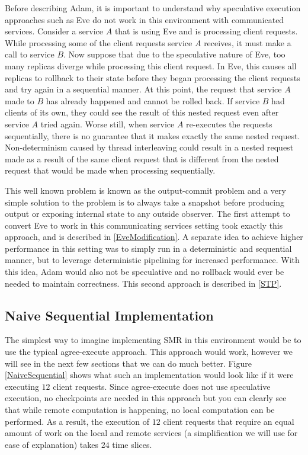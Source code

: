 \documentclass[11pt, oneside]{report}
\begin{document}
Before describing Adam, it is important to understand why speculative execution approaches such as Eve do not work in this environment with communicated services. 
Consider a service $A$ that is using Eve and is processing client requests. 
While processing some of the client requests service $A$ receives, it must make a call to service $B$. 
Now suppose that due to the speculative nature of Eve, too many replicas diverge while processing this client request. In Eve, this causes all replicas to rollback to their state before they began processing the client requests and try again in a sequential manner. 
At this point, the request that service $A$ made to $B$ has already happened and cannot be rolled back. 
If service $B$ had clients of its own, they could see the result of this nested request even after service $A$ tried again. 
Worse still, when service $A$ re-executes the requests sequentially, there is no guarantee that it makes exactly the same nested request. 
Non-determinism caused by thread interleaving could result in a nested request made as a result of the same client request that is different from the nested request that would be made when processing sequentially.

This well known problem is known as the output-commit problem and a very simple solution to the problem is to always take a snapshot before producing output or exposing internal state to any outside observer. 
The first attempt to convert Eve to work in this communicating services setting took exactly this approach, and is described in \ref{EveModification}. 
A separate idea to achieve higher performance in this setting was to simply run in a deterministic and sequential manner, but to leverage deterministic pipelining for increased performance. 
With this idea, Adam would also not be speculative and no rollback would ever be needed to maintain correctness. This second approach is described in \ref{STP}.

\subsection{Naive Sequential Implementation}

The simplest way to imagine implementing SMR in this environment would be to use the typical agree-execute approach.
This approach would work, however we will see in the next few sections that we can do much better. 
Figure \ref{NaiveSequential} shows what such an implementation would look like if it were executing $12$ client requests. 
Since agree-execute does not use speculative execution, no checkpoints are needed in this approach but you can clearly see that while remote computation is happening, no local computation can be performed.
As a result, the execution of $12$ client requests that require an equal amount of work on the local and remote services (a simplification we will use for ease of explanation) takes $24$ time slices.
\end{document}
